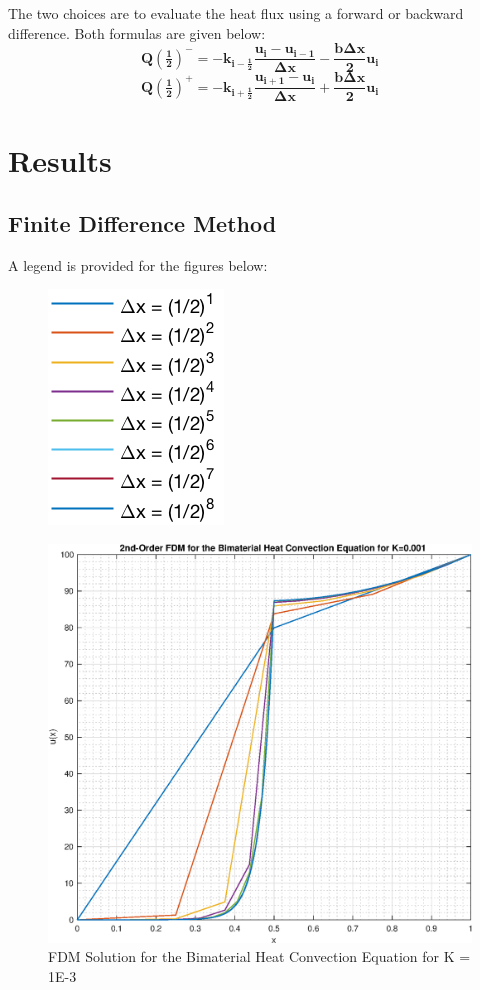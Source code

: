 \documentclass[10pt]{article}
\begin{document}
The two choices are to evaluate the heat flux using a forward or backward difference. Both formulas are given below:
\begin{equation}
\mathbf{Q(\tfrac{1}{2})^- = -k_{i-\tfrac{1}{2}}\frac{u_i-u_{i-1}}{\Delta x}-\frac{b\Delta x}{2}u_i}
\end{equation}
\begin{equation}
\mathbf{Q(\tfrac{1}{2})^+ = -k_{i+\tfrac{1}{2}}\frac{u_{i+1}-u_{i}}{\Delta x}+\frac{b\Delta x}{2}u_i}
\end{equation}

\newpage

\section*{Results}

\subsection*{Finite Difference Method}

A legend is provided for the figures below:
\begin{figure}[H]
	\begin{center}
		\includegraphics[width=0.15\linewidth]{legend}
	\end{center}
\end{figure}
\vfill
\begin{figure}[H]
	\begin{center}
		\includegraphics[width=0.6\linewidth]{solution_K_0001}
		\caption{FDM Solution for the Bimaterial Heat Convection Equation for K = 1E-3}
	\end{center}
\end{figure}
\end{document}
